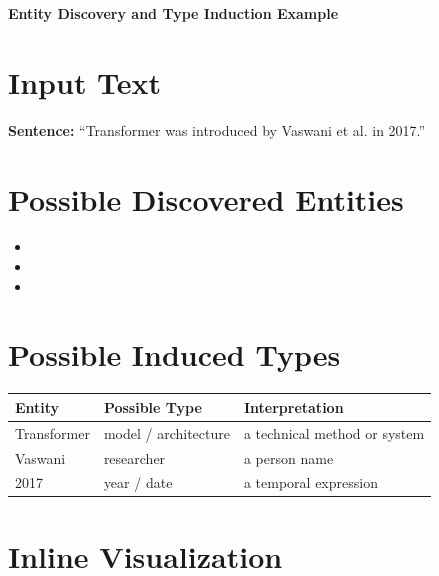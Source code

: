 \documentclass[12pt]{article}
\begin{document}
\begin{center}
    {\LARGE \textbf{Entity Discovery and Type Induction Example}}
\end{center}

\vspace{0.5cm}

\section*{Input Text}

\noindent
\textbf{Sentence:} ``Transformer was introduced by Vaswani et al. in 2017.''

\vspace{0.6cm}

\section*{Possible Discovered Entities}

\begin{itemize}
    \item {}
    \item {}
    \item {}
\end{itemize}

\vspace{0.6cm}

\section*{Possible Induced Types}

\begin{center}
\renewcommand{\arraystretch}{1.4}
\begin{tabular}{lll}
\toprule
\textbf{Entity} & \textbf{Possible Type} & \textbf{Interpretation} \\
\midrule
Transformer & model / architecture & a technical method or system \\
Vaswani & researcher & a person name \\
2017 & year / date & a temporal expression \\
\bottomrule
\end{tabular}
\end{center}

\vspace{0.8cm}

\section*{Inline Visualization}
\end{document}
